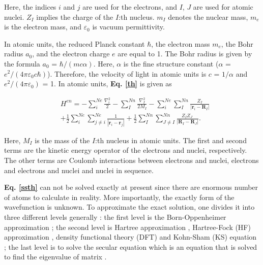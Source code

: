 \documentclass[a4paper, 12pt, titlepage,oneside,drop]{kthesis}
\begin{document}
Here, the indices $i$ and $j$ are used for the electrons, and $I$, $J$ are used for atomic nuclei. $Z_I$ implies the charge of the $I$:th nucleus.
$m_I$ denotes the nuclear mass, $m_e$ is the electron mass, and $\varepsilon_0$ is vacuum permittivity.

In atomic units, the reduced Planck constant $\hbar$, the electron mass $m_e$, the Bohr radius $a_0$, and the electron charge
$e$ are equal to 1. The Bohr radius is given by the formula $a_0$ = ${\hbar} / {(mc\alpha)}$. Here, $\alpha$ is the fine structure
constant ($\alpha$ = ${e^2}/{(4 \pi \varepsilon_0 c \hbar)}$). Therefore, the velocity of light in atomic units is $c$ = $1/{\alpha}$ and ${e^2}/{(4 \pi \varepsilon_0)}$ = 1. In atomic units, \textbf{Eq. \ref{th}} is given as 

\begin{equation}\label{sth}\begin{split}
& H^{en} = - \sum\limits_i^{Ne}   \frac{{{\nabla}_{{i}}^{2}}}{2} - \sum\limits_I^{Nn} \frac{{{\nabla}_{{I}}^{2}}}{2 M_{I}}  - \sum\limits_i^{Ne} \sum\limits_I^{Nn} \frac{Z_{I}}{|\textbf{r}_{i}-\textbf{R}_{I}|} \\
& + \frac{1}{2} \sum\limits_i^{Ne} \sum\limits_{j \neq i}^{Ne} \frac{1}{ |\textbf{r}_{i}-\textbf{r}_{j}|} + \frac{1}{2} \sum\limits_I^{Nn} \sum\limits_{J \neq I}^{Nn} \frac{Z_{I} Z_{J}\ }{|\textbf{R}_{I}-\textbf{R}_{J}|}.
\end{split}\end{equation}

Here, $M_I$ is the mass of the $I$:th nucleus in atomic units. The first and second terms are the kinetic energy operator of the electrons and nuclei, respectively.
The other terms are Coulomb interactions between electrons and nuclei, electrons and electrons and nuclei and nuclei in sequence.

\textbf{Eq. \ref{ssth}} can not be solved exactly at present since there are enormous number of atoms to calculate in reality. More importantly, the exactly form of the wavefunction is unknown.
To approximate the exact solution, one divides it into three different levels generally \cite{martin2004electronic, Cottenierwien2k}: the first level is the Born-Oppenheimer approximation \cite{bornoppenheimer}; the second
level is Hartree approximation \cite{hartreeapproximation},
Hartree-Fock (HF) approximation \cite{hartreefockapproximation}, density functional theory (DFT) \cite{hohenberg1964inhomogeneous} and Kohn-Sham (KS) equation \cite{kohn1965self}; the last level is to solve the secular 
equation which is an equation that is solved to find the eigenvalue of matrix \cite{martin2004electronic, Cottenierwien2k}.
\end{document}
